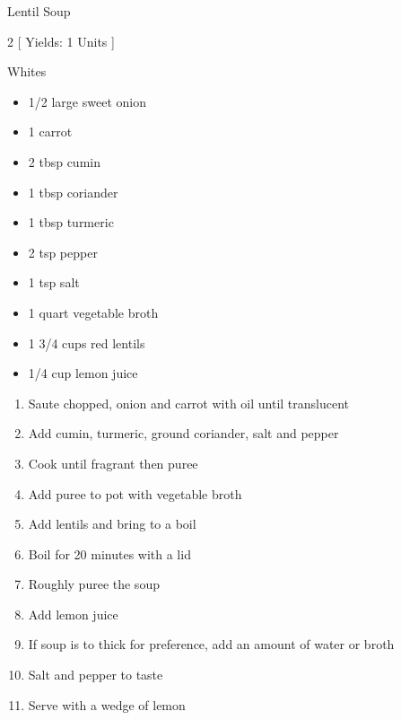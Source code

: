 \begin{Large}
    Lentil Soup
\end{Large}

\begin{scriptsize}
\begin{multicols}{2}
[
\vspace{1em}
Yields: 1 Units
\vspace{-1.5em}
]

Whites
\begin{itemize}
    \item 1/2 large sweet onion
    \item 1 carrot
    \item 2 tbsp cumin
    \item 1 tbsp coriander
    \item 1 tbsp turmeric
    \item 2 tsp pepper
    \item 1 tsp salt
    \item 1 quart vegetable broth
    \item 1 3/4 cups red lentils
    \item 1/4 cup lemon juice
\end{itemize}
\end{multicols}
\end{scriptsize}

\begin{footnotesize}
\begin{enumerate}
    \item Saute chopped, onion and carrot with oil until translucent

    \item Add cumin, turmeric, ground coriander, salt and pepper

    \item Cook until fragrant then puree

    \item Add puree to pot with vegetable broth 

    \item Add lentils and bring to a boil

    \item Boil for 20 minutes with a lid

    \item Roughly puree the soup

    \item Add lemon juice

    \item If soup is to thick for preference, add an amount of water or broth

    \item Salt and pepper to taste

    \item Serve with a wedge of lemon

\end{enumerate}
\end{footnotesize}

\vspace{2em}
